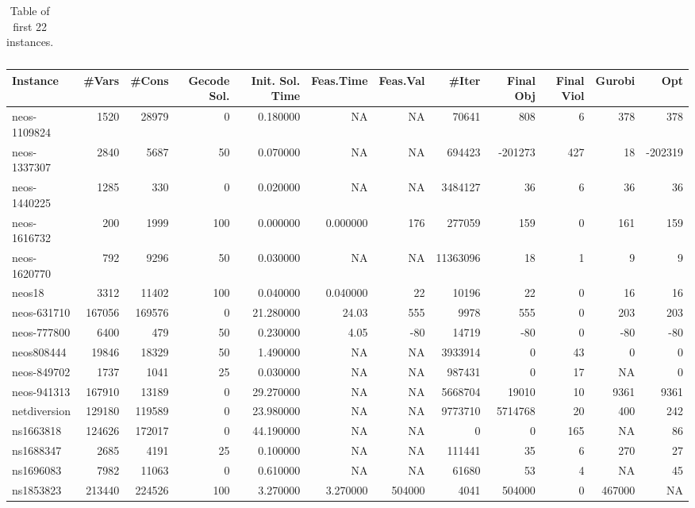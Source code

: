 \begin{sidewaystable}
\begin{tabular}{|l|r|r|r|r|r|r|r|r|r|r|r|}
\end{tabular}
\caption{Table of first 22 instances.}
\label{tab1}
\end{sidewaystable}
\begin{sidewaystable}
\centering
\begin{tabular}{|l|r|r|r|r|r|r|r|r|r|r|r|}
\hline
Instance    & \#Vars & \#Cons & Gecode Sol. & Init. Sol. Time & Feas.Time & Feas.Val & 
\#Iter & Final Obj & Final Viol & Gurobi & Opt \\ \hline
neos-1109824 & 1520 & 28979 & 0 & 0.180000 & NA & NA & 70641 & 808 & 6 & 378 & 378\\ \hline 
neos-1337307 & 2840 & 5687 & 50 & 0.070000 & NA & NA & 694423 & -201273 & 427 & 18 & -202319\\ \hline 
neos-1440225 & 1285 & 330 & 0 & 0.020000 & NA & NA & 3484127 & 36 & 6 & 36 & 36\\ \hline 
neos-1616732 & 200 & 1999 & 100 & 0.000000 & 0.000000 & 176 & 277059 & 159 & 0 & 161 & 159 \\ \hline 
neos-1620770 & 792 & 9296 & 50 & 0.030000 & NA & NA & 11363096 & 18 & 1 & 9 & 9\\ \hline 
neos18 & 3312 & 11402 & 100 & 0.040000 & 0.040000 & 22 & 10196 & 22 & 0 & 16 & 16\\ \hline 
neos-631710 & 167056 & 169576 & 0 & 21.280000 & 24.03 & 555 & 9978 & 555  & 0 & 203 & 203  \\ \hline 
neos-777800 & 6400 & 479 & 50 & 0.230000 & 4.05 & -80 & 14719 & -80 & 0  & -80 & -80\\ \hline 
neos808444 & 19846 & 18329 & 50 & 1.490000 & NA & NA & 3933914 & 0 & 43 & 0 & 0\\ \hline 
neos-849702 & 1737 & 1041 & 25 & 0.030000 & NA & NA & 987431 & 0 & 17 & NA & 0\\ \hline 
neos-941313 & 167910 & 13189 & 0 & 29.270000 & NA & NA & 5668704 & 19010 & 10 & 9361 & 9361\\ \hline 
netdiversion & 129180 & 119589 & 0 & 23.980000 & NA & NA & 9773710 & 5714768 & 20 & 400 & 242\\ \hline 
ns1663818 & 124626 & 172017 & 0 & 44.190000 & NA & NA & 0 & 0 & 165 & NA & 86\\ \hline 
ns1688347 & 2685 & 4191 & 25 & 0.100000 & NA & NA & 111441 & 35 & 6 & 270 & 27\\ \hline 
ns1696083 & 7982 & 11063 & 0 & 0.610000 & NA & NA & 61680 & 53 & 4 & NA & 45\\ \hline 
ns1853823 & 213440 & 224526 & 100 & 3.270000 & 3.270000 & 504000 & 4041 & 504000 & 0 & 467000 & NA\\ \hline 

\end{tabular}
\end{sidewaystable}
